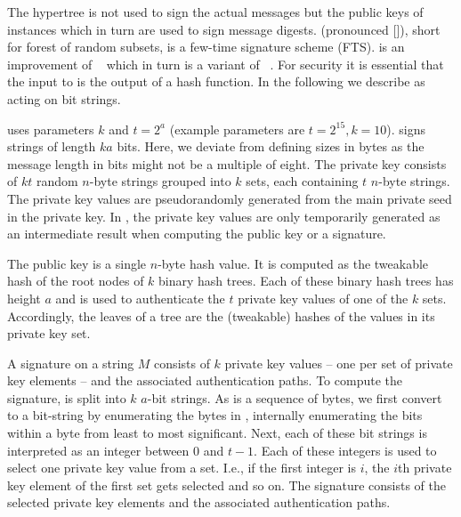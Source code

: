The \spx hypertree \hyper is not used to sign the actual messages but the
public keys of \fors instances which in turn are used to sign message digests.
\fors (pronounced []), short for forest of random subsets, is a few-time
signature scheme (FTS). \fors is an improvement of \horst~\cite{Bernstein2015}
which in turn is a variant of \hors~\cite{Reyzin2002}.
For security it is essential that the input to \fors is the output of a
hash function. In the following we describe \fors as acting on bit strings.


\fors uses parameters $k$ and $t=2^a$ (example parameters are $t=2^{15}, k=10$).
\fors signs strings of length $ka$ bits. Here, we deviate from defining
sizes in bytes as the message length in bits might not be a multiple of eight.
The private key consists of $kt$
random $n$-byte strings grouped
into $k$ sets, each containing $t$ $n$-byte strings. The private key values
are pseudorandomly generated from the main private seed \sseed in the \spx private
key. In \spx, the \fors private key values are only temporarily generated as an
intermediate result when computing the public key or a signature.

The \fors public key is a single $n$-byte hash value. It is computed as the
tweakable hash of the root nodes of $k$ binary hash trees. Each of these binary
hash trees has height $a$ and is used to authenticate the $t$ private key
values of one of the $k$ sets. Accordingly, the leaves of a tree are the
(tweakable) hashes of the values in its private key set.

A signature on a string $M$ consists of $k$ private key values -- one per
set of private key elements -- and the
associated authentication paths. To compute the signature, \md is
split into $k$ $a$-bit strings. As \md is a sequence of bytes,
we first convert to a bit-string by enumerating the bytes in \md,
internally enumerating the bits within a byte from least to most significant.
Next, each of these bit strings is
interpreted as an integer between $0$ and $t-1$. Each of these integers is used to
select one private key value from a set. I.e., if the first integer is $i$, the
$i$th private key element of the first set gets selected and so on. The signature
consists of the selected private key elements and the associated authentication
paths.



